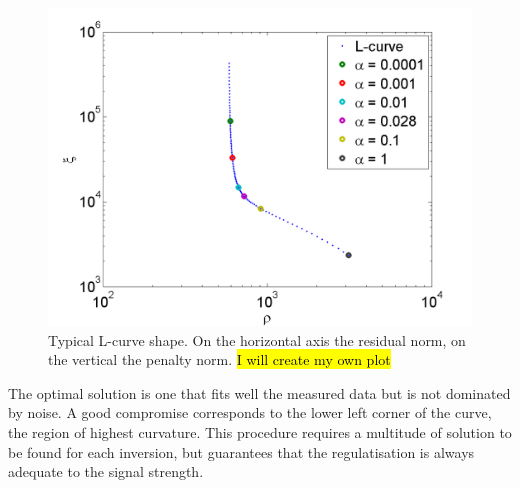 \begin{figure}
	\centering
	\includegraphics[width=\linewidth]{Chapters/chapter2/figs/l-curve.png}
	\caption{Typical L-curve shape. On the horizontal axis the residual norm, on the vertical the penalty norm. \hl{I will create my own plot}}
	\label{fig:l-curve}
\end{figure}

The optimal solution is one that fits well the measured data but is not dominated by noise. A good compromise corresponds to the lower left corner of the curve, the region of highest curvature. This procedure requires a multitude of solution to be found for each inversion, but guarantees that the regulatisation is always adequate to the signal strength.
